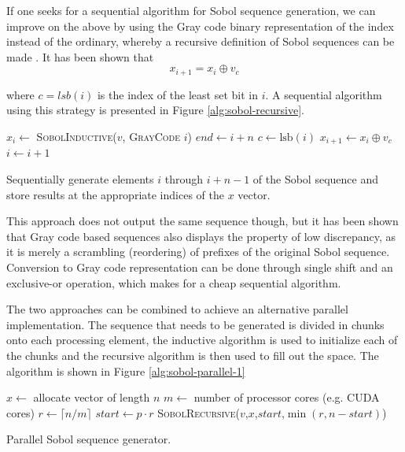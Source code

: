 If one seeks for a sequential algorithm for Sobol sequence generation,
we can improve on the above by using the Gray code binary
representation of the index instead of the ordinary, whereby a
recursive definition of Sobol sequences can be made
\cite{bratley1988algorithm}. It has been shown that
\begin{equation}
x_{i+1} = x_i \oplus v_c\label{eq:sobol-recurse}
\end{equation}

where $c = \mathit{lsb}(i)$ is the index of the least set bit in
$i$. A sequential algorithm using this strategy is presented in Figure
\ref{alg:sobol-recursive}.

\begin{algorithm}
  \begin{algorithmic}
    \State $x_i \gets$ \textsc{SobolInductive}($v$, \textsc{GrayCode} $i$)
    \State $end \gets i + n$
    \State $c \gets \mathrm{lsb}(i)$
    \State $x_ {i+1} \gets x_i \oplus v_c$
    \State $i \gets i + 1$
    \EndWhile
    \EndFunction
  \end{algorithmic}
  \caption{Sequentially generate elements $i$ through $i+n-1$ of the
    Sobol sequence and store results at the appropriate indices of
    the $x$ vector.}
  \label{alg:sobol-recursive}
\end{algorithm}

This approach does not output the same sequence though, but it has
been shown \cite{bratley1988algorithm} that Gray code based sequences
also displays the property of low discrepancy, as it is merely a
scrambling (reordering) of prefixes of the original Sobol
sequence. Conversion to Gray code representation can be done through
single shift and an exclusive-or operation, which makes for a cheap
sequential algorithm.

The two approaches can be combined to achieve an alternative parallel
implementation. The sequence that needs to be generated is divided in
chunks onto each processing element, the inductive algorithm is used
to initialize each of the chunks and the recursive algorithm is then
used to fill out the space. The algorithm is shown in Figure
\ref{alg:sobol-parallel-1}

\begin{algorithm}
  \begin{algorithmic}
    \State $x \gets$ allocate vector of length $n$
    \State $m \gets$ number of processor cores (e.g. CUDA cores)
    \State $r \gets \lceil n/m \rceil$
    \State $start \gets p\cdot r$
    \State \textsc{SobolRecursive}($v$,$x$,$start$,$\min(r,n-start)$)
    \EndParFor
    \EndFunction
  \end{algorithmic}
  \caption{Parallel Sobol sequence generator.}
  \label{alg:sobol-parallel-1}
\end{algorithm}

